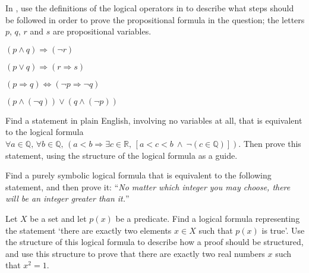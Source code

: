 In , use the definitions of the logical operators in  to describe what steps should be followed in order to prove the propositional formula in the question; the letters $p$, $q$, $r$ and $s$ are propositional variables.

\begin{chapex}
\label{cqStructureProofBegin}
$(p \wedge q) \Rightarrow (\neg r)$
\end{chapex}

\begin{chapex}
$(p \vee q) \Rightarrow (r \Rightarrow s)$
\end{chapex}

\begin{chapex}
$(p \Rightarrow q) \Leftrightarrow (\neg p \Rightarrow \neg q)$
\end{chapex}

\begin{chapex}
\label{cqStructureProofEnd}
$(p \wedge (\neg q)) \vee (q \wedge (\neg p))$
\end{chapex}


\begin{chapex}
Find a statement in plain English, involving no variables at all, that is equivalent to the logical formula $\forall a \in \mathbb{Q},\, \forall b \in \mathbb{Q},\, (a < b \Rightarrow \exists c \in \mathbb{R},\, [a < c < b ~\wedge~ \neg (c \in \mathbb{Q})])$. Then prove this statement, using the structure of the logical formula as a guide.
\end{chapex}

\begin{chapex}
Find a purely symbolic logical formula that is equivalent to the following statement, and then prove it: ``\textit{No matter which integer you may choose, there will be an integer greater than it.}''
\end{chapex}

\begin{chapex}
Let $X$ be a set and let $p(x)$ be a predicate. Find a logical formula representing the statement `there are exactly two elements $x \in X$ such that $p(x)$ is true'. Use the structure of this logical formula to describe how a proof should be structured, and use this structure to prove that there are exactly two real numbers $x$ such that $x^2=1$.
\end{chapex}

